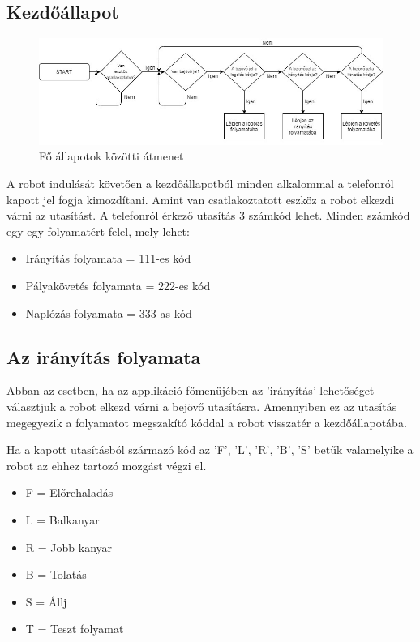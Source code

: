 \documentclass[]{thesis-ekf}
\theoremstyle{definition}
\begin{document}
\subsection{Kezdőállapot}\label{kezdokepernyo_allapot}
\begin{figure}[h]
	\centering
	\includegraphics[width=\columnwidth]{images/grafok/fomenu_graf}
	\caption{Fő állapotok közötti átmenet}
	\label{start_allapot}
\end{figure}
A robot indulását követően a kezdőállapotból minden alkalommal a telefonról kapott jel fogja kimozdítani. Amint van csatlakoztatott eszköz a robot elkezdi várni az utasítást. A telefonról érkező utasítás 3 számkód lehet. Minden számkód egy-egy folyamatért felel, mely lehet:
\begin{itemize}
	\item Irányítás folyamata = 111-es kód
	\item Pályakövetés folyamata = 222-es kód
	\item Naplózás folyamata = 333-as kód
\end{itemize}
\subsection{Az irányítás folyamata}\label{controlkepernyo_allapo}
Abban az esetben, ha az applikáció főmenüjében az ’irányítás’ lehetőséget választjuk a robot elkezd várni a bejövő utasításra. Amennyiben ez az utasítás megegyezik a folyamatot megszakító kóddal a robot visszatér a kezdőállapotába.

Ha a kapott utasításból származó kód az 'F', 'L', 'R', 'B', 'S' betűk valamelyike a robot az ehhez tartozó mozgást végzi el.
\begin{itemize}
	\item F = Előrehaladás
	\item L = Balkanyar
	\item R = Jobb kanyar
	\item B = Tolatás
	\item S = Állj
	\item T = Teszt folyamat
\end{itemize}
\end{document}
